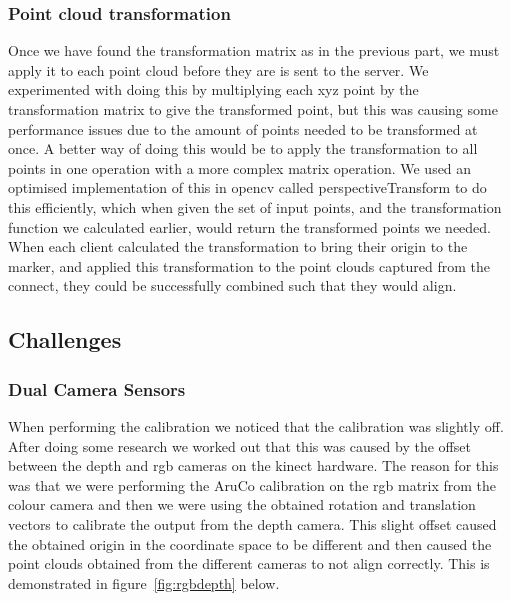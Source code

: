 \documentclass{article}
\begin{document}
\subsubsection{Point cloud transformation}
Once we have found the transformation matrix as in the previous part, we must apply it to each point cloud before they are is sent to the server. We experimented with doing this by multiplying each xyz point by the transformation matrix to give the transformed point, but this was causing some performance issues due to the amount of points needed to be transformed at once. A better way of doing this would be to apply the transformation to all points in one operation with a more complex matrix operation. We used an optimised implementation of this in opencv called perspectiveTransform to do this efficiently, which when given the set of input points, and the transformation function we calculated earlier, would return the transformed points we needed. When each client calculated the transformation to bring their origin to the marker, and applied this transformation to the point clouds captured from the connect, they could be successfully combined such that they would align.

\newpage
\subsection{Challenges}
\subsubsection{Dual Camera Sensors}
When performing the calibration we noticed that the calibration was slightly off. After doing some research we worked out that this was caused by the offset between the depth and rgb cameras on the kinect hardware. The reason for this was that we were performing the AruCo calibration on the rgb matrix from the colour camera and then we were using the obtained rotation and translation vectors to calibrate the output from the depth camera. This slight offset caused the obtained origin in the coordinate space to be different and then caused the point clouds obtained from the different cameras to not align correctly. This is demonstrated in figure~\ref{fig:rgbdepth} below.
\end{document}

